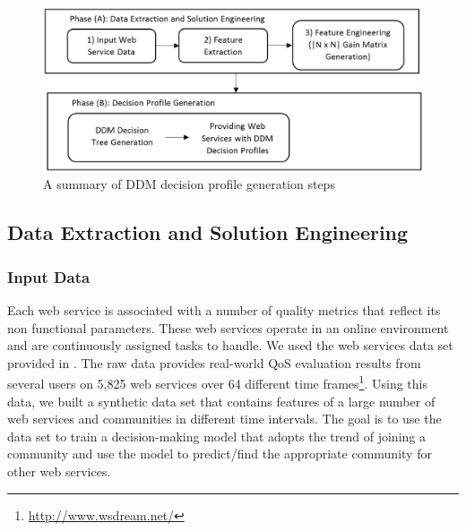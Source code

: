 \documentclass[11pt,onecolumn]{IEEEtran}
\begin{document}
\begin{figure}%
\centerline{\includegraphics[width=5.25in]{figures/steps.eps}}
\caption{A summary of DDM decision profile generation steps}
\label{fig_steps}
\end{figure}

\subsection{Data Extraction and Solution Engineering}\label{ss:learningdata}

\subsubsection{Input Data}\label{sss:webservices}

Each web service is associated with a number of quality metrics that reflect its non functional parameters. These web services operate in an online environment and are continuously assigned tasks to handle. %
We used the web services data set provided in \cite{10.1109/ISSRE.2011.17}. The raw data provides real-world QoS evaluation results from several users on 5,825 web services over 64 different time frames\footnote{\url{http://www.wsdream.net/}}. %
Using this data, we built a synthetic data set that contains features of a large number of web services and communities in different time intervals. The goal is to use the data set to train a decision-making model that adopts the trend of joining a community and use the model to predict/find the appropriate community for other web services. %
\end{document}

